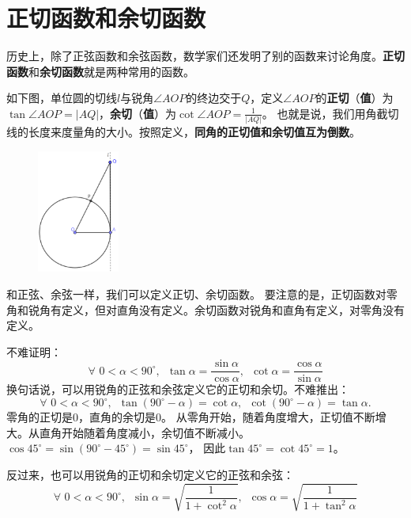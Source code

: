 \documentclass[12pt,UTF8]{ctexbook}
\begin{document}
\section{正切函数和余切函数}

历史上，除了正弦函数和余弦函数，数学家们还发明了别的函数来讨论角度。\textbf{正切函数}和\textbf{余切函数}就是两种常用的函数。

如下图，单位圆的切线$l$与锐角$\angle AOP$的终边交于$Q$，定义$\angle AOP$的\textbf{正切}（\textbf{值}）为
$\tan\angle AOP = |AQ|$，\textbf{余切}（\textbf{值}）为$\cot\angle AOP = \frac{1}{|AQ|}$。
也就是说，我们用角截切线的长度来度量角的大小。按照定义，\textbf{同角的正切值和余切值互为倒数}。

\begin{figure} %
    \vspace{-15pt}
    \flushright
    \includegraphics[width=0.24\textwidth]{正切函数1.png}
\end{figure}

和正弦、余弦一样，我们可以定义正切、余切函数。
要注意的是，正切函数对零角和锐角有定义，但对直角没有定义。余切函数对锐角和直角有定义，对零角没有定义。

不难证明：
$$ \forall \,\, 0 < \alpha < 90^\circ, \,\,\, \tan \alpha = \frac{\sin \alpha}{\cos \alpha}, \,\,\, \cot \alpha = \frac{\cos \alpha}{\sin \alpha}$$
换句话说，可以用锐角的正弦和余弦定义它的正切和余切。不难推出：
$$ \forall \,\, 0 < \alpha < 90^\circ, \,\,\, \tan (90^\circ - \alpha) = \cot \alpha, \,\,\, \cot (90^\circ - \alpha) = \tan \alpha. $$
零角的正切是$0$，直角的余切是$0$。
从零角开始，随着角度增大，正切值不断增大。从直角开始随着角度减小，余切值不断减小。
$\cos 45^\circ = \sin (90^\circ - 45^\circ) = \sin 45^\circ $，
因此$\tan 45^\circ = \cot 45^\circ = 1$。

反过来，也可以用锐角的正切和余切定义它的正弦和余弦：
$$ \forall \,\, 0 < \alpha < 90^\circ, \,\,\, \sin \alpha = \sqrt{\frac{1}{1 + \cot^2 \alpha}}, \,\,\, \cos \alpha = \sqrt{\frac{1}{1 + \tan^2 \alpha}}$$
\end{document}
